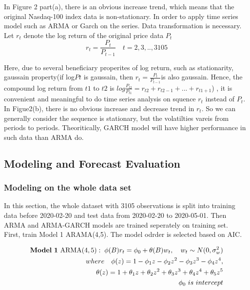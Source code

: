 \documentclass [letterpaper] {article}
\begin{document}
In Figure 2 part(a), there is an obvious increase trend, which means that the original Nasdaq-100 index data is non-stationary. In order to apply time series model such as ARMA or Garch on the series. Data transformation is necessary.\\
Let $r_t$ denote the log return of the original price data $P_t$
\[
r_{t}=\frac {P_{t}}{P_{t-1}}\quad t=2,3,..,3105
\]

\indent Here, due to several beneficiary properites of log return, such as stationarity, gaussain property(if log$Pt$ is gaussain, then $r_{t}=\frac {P_{t}}{P_{t-1}} $is also gaussain. Hence, the compound log return from $t1$ to $t2$ is $log\frac{P_{t2}}{P_{t1}}=r_{t2}+r_{t2-1}+...+r_{t1+1}$) , it is convenient and meaningful to do time series analysis on squence {$r_t$} instead of {$P_t$}.\\
\indent In Figue2(b),  there is no obvious increase and decrease trend in ${r_t}$. So we can generally consider the sequence is stationary, but the volatilties vareis from periods to periods. Theoritically, GARCH model will have higher performance in such data than ARMA do. 

\subsection{Modeling and Forecast Evaluation}
\subsubsection{Modeling on the whole data set}
In this section, the whole dataset with 3105 observations is split into training data before 2020-02-20 and test data from 2020-02-20 to 2020-05-01. Then ARMA and ARMA-GARCH models are trained seperately on training set.\\
First, train Model 1 ARAMA(4,5). The model odrder is selected based on AIC.

\begin{equation}
\begin{aligned}
\mathrm{\bold{Model\ 1}\ ARMA(4,5)}:\; \phi(B)r_t = \phi_0+\theta (B)w_t, \quad w_t \sim N(0, \sigma_{w}^2)\\
where\quad  \phi(z)=1-\phi_1z-\phi_2z^2-\phi_3z^3-\phi_4z^4,\\ \theta(z)=1+\theta_1z+\theta_2z^2+\theta_3z^3+\theta_4z^4+\theta_5z^5\\
\phi_0\ is\ intercept
\end{aligned}
\end{equation}
\end{document}
